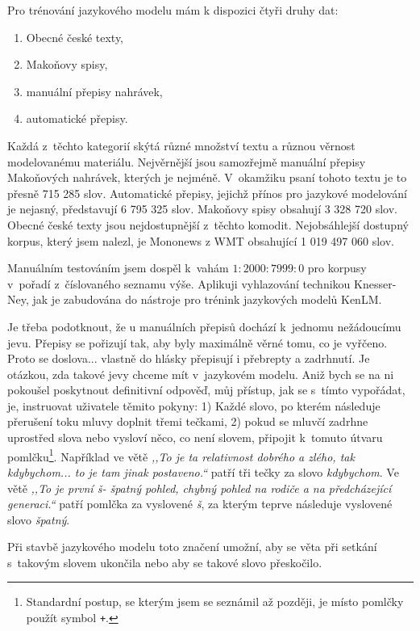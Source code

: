 Pro trénování jazykového modelu mám k dispozici čtyři druhy dat:
\begin{enumerate}
\item{Obecné české texty,}
\item{Makoňovy spisy,}
\item{manuální přepisy nahrávek,}
\item{automatické přepisy.}
\end{enumerate}

Každá z~těchto kategorií skýtá různé množství textu a různou věrnost
modelovanému materiálu. Nejvěrnější jsou samozřejmě manuální přepisy Makoňových
nahrávek, kterých je nejméně. V~okamžiku psaní tohoto textu je to přesně 715 285
slov. Automatické přepisy, jejichž přínos pro jazykové modelování je nejasný,
představují 6 795 325 slov. Makoňovy spisy obsahují 3 328 720 slov. Obecné české
texty jsou nejdostupnější z~těchto komodit. Nejobsáhlejší dostupný korpus, který
jsem nalezl, je Mononews z WMT\cite{wmt19} obsahující 1 019 497 060 slov.

Manuálním testováním jsem dospěl k~vahám $1 : 2000 : 7999 : 0$ pro korpusy
v~pořadí z~číslovaného seznamu výše. Aplikuji vyhlazování technikou
Knesser-Ney\cite{chen1999empirical}, jak je zabudována do nástroje pro trénink
jazykových modelů KenLM\cite{heafield2011kenlm}.

Je třeba podotknout, že u manuálních přepisů dochází k~jednomu
nežádoucímu jevu. Přepisy se pořizují tak, aby byly maximálně věrné tomu, co je
vyřčeno. Proto se doslova... vlastně do hlásky přepisují i přebrepty a zadrhnutí.
Je otázkou, zda takové jevy chceme mít v~jazykovém modelu. Aniž bych se na ni
pokoušel poskytnout definitivní odpověď, můj přístup, jak se s~tímto vypořádat,
je, instruovat uživatele těmito pokyny: 1) Každé slovo, po kterém následuje přerušení toku
mluvy doplnit třemi tečkami, 
2) pokud se mluvčí zadrhne uprostřed slova nebo vysloví něco, co není slovem,
připojit k~tomuto útvaru pomlčku\footnote{Standardní postup, se kterým jsem se
seznámil až později, je místo pomlčky použít symbol \texttt{+}.}. Například ve větě {\em ,,To je ta relativnost
dobrého a zlého, tak kdybychom... to je tam jinak postaveno.``} patří tři tečky
za slovo {\em kdybychom}. Ve větě {\em ,,To je první š- špatný pohled, chybný pohled na rodiče a na
předcházející generaci.``} patří pomlčka za vyslovené {\em š}, za kterým
teprve následuje vyslovené slovo {\em špatný}.

Při stavbě jazykového modelu toto značení umožní, aby se věta při setkání
s~takovým slovem ukončila nebo aby se takové slovo přeskočilo.

